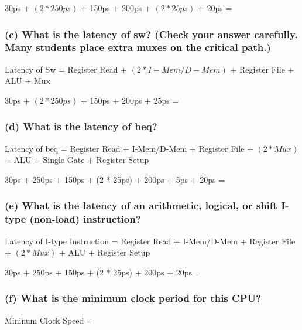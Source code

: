 \documentclass{article}
\begin{document}
    \vspace*{0.1in}

    30ps + $(2 * 250ps)$ + 150ps + 200ps + $(2 * 25ps)$ + 20ps = 

    \subsubsection*{(c) What is the latency of sw? (Check your answer carefully. Many students place extra muxes on the critical
    path.)}

    \noindent Latency of Sw = Register Read + $(2 * I-Mem/D-Mem)$ + Register File + ALU + Mux

    \vspace*{0.1in}

    30ps + $(2 * 250ps)$ + 150ps + 200ps + 25ps = 

    \subsubsection*{(d) What is the latency of beq?}

    \noindent Latency of beq = Register Read + I-Mem/D-Mem + Register File + $(2 * Mux)$ + ALU + Single Gate + Register Setup

    \vspace*{0.1in}

    30ps + 250ps + 150ps + (2 * 25ps) + 200ps + 5ps + 20ps = 

    \subsubsection*{(e) What is the latency of an arithmetic, logical, or shift
    I-type (non-load) instruction?}

    \noindent Latency of I-type Instruction = Register Read + I-Mem/D-Mem + Register File + $(2 * Mux)$ + ALU + Register Setup

    \vspace*{0.1in}

    30ps + 250ps + 150ps + (2 * 25ps) + 200ps + 20ps = 

    \subsubsection*{(f) What is the minimum clock period for this CPU?}

    Mininum Clock Speed = 
\end{document}
